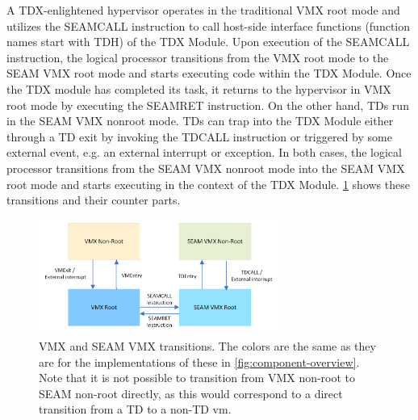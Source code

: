 A TDX-enlightened hypervisor operates in the traditional VMX root mode and utilizes the SEAMCALL instruction to call host-side interface functions (function names start with TDH) of the TDX Module. Upon execution of the SEAMCALL instruction, the logical processor transitions from the VMX root mode to the SEAM VMX root mode and starts executing code within the TDX Module. Once the TDX module has completed its task, it returns to the hypervisor in VMX root mode by executing the SEAMRET instruction. On the other hand, TDs run in the SEAM VMX nonroot mode. TDs can trap into the TDX Module either through a TD exit by invoking the TDCALL instruction or triggered by some external event, e.g. an external interrupt or exception. In both cases, the logical processor transitions from the SEAM VMX nonroot mode into the SEAM VMX root mode and starts executing in the context of the TDX Module. \cref{fig:seamFigure} shows these transitions and their counter parts.

\begin{figure}
\centering
\includegraphics[width=0.7\textwidth]{figures/SEAMVMXÜBergänge.png}
\caption{VMX and SEAM VMX transitions. The colors are the same as they are for the implementations of these in \cref{fig:component-overview}. Note that it is not possible to transition from VMX non-root to SEAM non-root directly, as this would correspond to a direct transition from a TD to a non-TD vm.}
\label{fig:seamFigure}
\end{figure}
